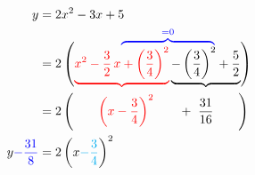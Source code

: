 \documentclass{article}
\begin{document}
\begin{align}
y &= 2x^2 -3x +5\\\nonumber
  & \hphantom{= \ 2\left(x^2-\frac{3}{2}\,x\right. }%
         \textcolor{blue}{%
              \overbrace{\hphantom{+\left(\frac{3}{4}\right)^2- %
                  \left(\frac{3}{4}\right)^2}}^{=0}}\\[-11pt]
  &= 2\left(\textcolor{red}{%
     \underbrace{%
         x^2-\frac{3}{2}\,x + \left(\frac{3}{4}\right)^2}%
     }%
     \underbrace{%
        - \left(\frac{3}{4}\right)^2 + \frac{5}{2}}%
     \right)\\
  &= 2\left(\qquad\textcolor{red}{\left(x-\frac{3}{4}\right)^2}
     \qquad + \ \frac{31}{16}\qquad\right)\\
y\textcolor{blue}{-\frac{31}{8}}
  &= 2\left(x\textcolor{cyan}{-\frac{3}{4}}\right)^2%
\end{align}
\end{document}
